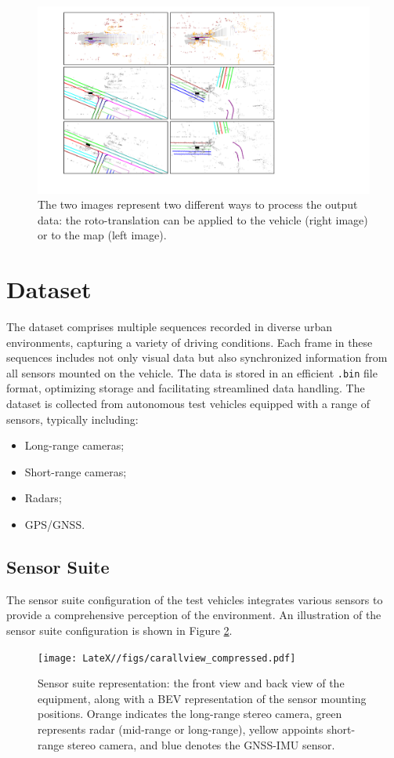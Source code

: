 \begin{figure}[H]
    \centering
    \includegraphics[width=0.85\linewidth]{LateX//figs/post_proc.pdf}
    \caption{The two images represent two different ways to process the output data: the roto-translation can be applied to the vehicle (right image) or to the map (left image).}
    \label{fig:post_processing}
\end{figure}

\section{Dataset}

The dataset comprises multiple sequences recorded in diverse urban environments, capturing a variety of driving conditions. Each frame in these sequences includes not only visual data but also synchronized information from all sensors mounted on the vehicle. The data is stored in an efficient \texttt{.bin} file format, optimizing storage and facilitating streamlined data handling. The dataset is collected from autonomous test vehicles equipped with a range of sensors, typically including:
\begin{itemize}
    \item Long-range cameras;
    \item Short-range cameras;
    \item Radars;
    \item GPS/GNSS.
\end{itemize}

\subsection{Sensor Suite}

The sensor suite configuration of the test vehicles integrates various sensors to provide a comprehensive perception of the environment. An illustration of the sensor suite configuration is shown in Figure \ref{fig:sensor-suite}. 
\begin{figure}[H]
    \centering
    \texttt{[image: LateX//figs/carallview\_compressed.pdf]}
    \caption{Sensor suite representation: the front view and back view of the equipment, along with a BEV representation of the sensor mounting positions. Orange indicates the long-range stereo camera, green represents radar (mid-range or long-range), yellow appoints short-range stereo camera, and blue denotes the GNSS-IMU sensor.}
    \label{fig:sensor-suite}
\end{figure}

